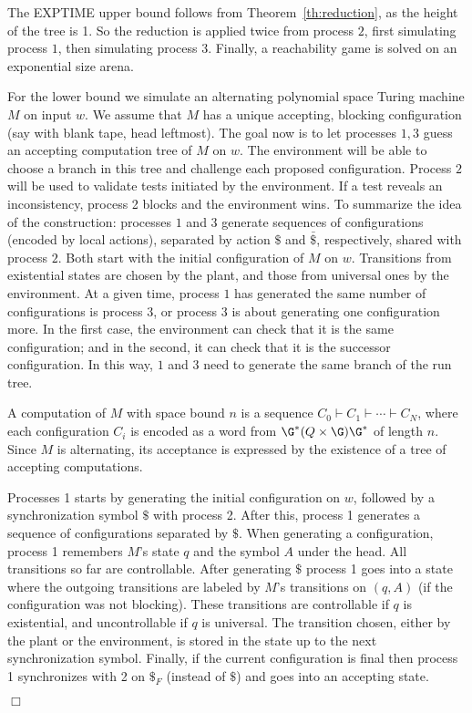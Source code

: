\documentclass{llncs}
\renewenvironment{proof}{{\em Proof. }}{\nopagebreak
  \hspace*{\fill}$\Box$}
\begin{document}
\begin{proof}
The EXPTIME upper bound follows from Theorem~\ref{th:reduction}, as
  the height of the tree is 1.
So the reduction is applied twice
from process $2$, first simulating process $1$, then simulating
process $3$. Finally, a reachability game is solved on an exponential
size arena.  

  For the lower bound we simulate an alternating polynomial space
  Turing machine $M$ on input $w$. We assume that $M$ has a unique
  accepting, blocking configuration (say with blank tape, head
  leftmost). The goal now is to let processes $1,3$ guess an accepting
  computation tree of $M$ on $w$. The environment will be able to
  choose a branch in this tree and challenge each proposed
  configuration. Process $2$ will be used to validate tests initiated
  by the environment. If a test reveals an inconsistency, process 2
  blocks and the environment wins. To summarize the idea of the construction: 
  processes $1$ and $3$
  generate sequences of configurations (encoded by local actions),
  separated by action $\$$ and $\bar{\$}$, respectively, shared with
  process $2$. Both start with the initial configuration of $M$ on
  $w$. Transitions from existential states are chosen by the plant,
  and those from universal ones by the environment. 
At a given time, process $1$ has generated the same number of
configurations is process $3$, or process $3$ is about generating one
configuration more. In the first case, the environment can check
that it is the
same configuration; and in the second, it can check that it is the successor
configuration. In this way, $1$ and $3$ need to generate the same branch of the
run tree.

  A computation of $M$ with space bound $n$ is a sequence $C_0
  \vdash C_1 \vdash \cdots \vdash C_N$, where each configuration $C_i$ is
  encoded as a word from $\G^* (Q \times \G) \G^*$ of length
  $n$. Since $M$ is alternating, its acceptance is expressed by the existence
  of a tree of accepting computations. 

  Processes 1 starts by generating the initial configuration on $w$, followed by a synchronization
  symbol $\$$ with process 2. After this, process 1 generates a sequence of
  configurations separated by $\$$. When generating a
  configuration, process 1 remembers $M$'s state $q$ and the symbol $A$
  under the head. All transitions so far are controllable. After
  generating $\$$ process 1 goes into a state where the outgoing
  transitions are labeled by $M$'s transitions on $(q,A)$ (if the
  configuration was not blocking). These transitions are controllable
  if $q$ is existential, and uncontrollable if $q$ is
  universal. The transition chosen, either by the plant or the
  environment, is  stored in the state up to the next synchronization symbol.  Finally, if the current
  configuration is final then process 1 synchronizes with 2 on $\$_F$
  (instead of $\$$) and goes into an accepting state. 


\end{proof}
\end{document}
